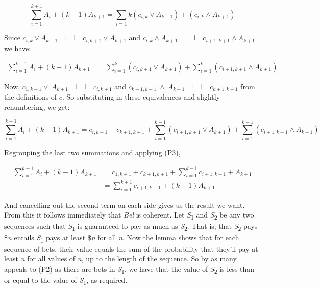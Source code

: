 \documentclass[
  10pt,
  letterpaper,
  DIV=11,
  numbers=noendperiod,
  twoside]{scrartcl}
\begin{document}
\[
\sum_{i=1}^{k+1}A_i + (k-1)A_{k+1} = \sum_{i=1}{k}(c_{i,k} \vee A_{k+1}) + (c_{i,k} \wedge A_{k+1})
\]

Since \(c_{i,k} \vee A_{k+1}\) \(\dashv\)~\(\vdash\)
\(c_{i,k+1} \vee A_{k+1}\) and \(c_{i,k} \wedge A_{k+1}\)
\(\dashv\)~\(\vdash\) \(c_{i+1,k+1} \wedge A_{k+1}\) we have:

\[
\begin{aligned}
\sum_{i=1}^{k+1}A_i + (k-1)A_{k+1} &= \sum_{i=1}^{k}(c_{i,k+1} \vee A_{k+1}) + \sum_{i=1}^{k}(c_{i+1,k+1} \wedge A_{k+1})
\end{aligned}
\]

Now, \(c_{1,k+1} \vee~ A_{k+1}\) \(\dashv\)~\(\vdash\) \(c_{i,k+1}\) and
\(c_{k+1,k+1} ~\wedge~ A_{k+1}\) \(\dashv\)~\(\vdash\) \(c_{k+1,k+1}\)
from the definitions of \(c\). So substituting in these equivalences and
slightly renumbering, we get:

\[
\sum_{i=1}^{k+1}A_i + (k-1)A_{k+1} = c_{i,k+1} +c_{k+1,k+1} + \sum_{i=1}^{k-1}(c_{i+1,k+1} \vee A_{k+1}) + \sum_{i=1}^{k-1}(c_{i+1,k+1} \wedge A_{k+1})
\]

Regrouping the last two summations and applying (P3),

\begin{figure*}

\[
\begin{aligned}
\sum_{i=1}^{k+1}A_i + (k-1)A_{k+1} &= c_{1,k+1} + c_{k+1,k+1} + \sum_{i=1}^{k-1}c_{i+1,k+1} + A_{k+1} \\
&= \sum_{i=1}^{k+1}c_{i+1,k+1} + (k-1)A_{k+1}
\end{aligned}
\]

\end{figure*}%

And cancelling out the second term on each side gives us the result we
want. From this it follows immediately that \emph{Bel} is coherent. Let
\emph{S}\textsubscript{1} and \emph{S}\textsubscript{2} be any two
sequences such that \emph{S}\textsubscript{1} is guaranteed to pay as
much as \emph{S}\textsubscript{2}. That is, that
\emph{S}\textsubscript{2} pays \$\emph{n} entails
\emph{S}\textsubscript{1} pays at least \$\emph{n} for all \emph{n}. Now
the lemma shows that for each sequence of bets, their value equals the
sum of the probability that they'll pay at least \emph{n} for all values
of \emph{n}, up to the length of the sequence. So by as many appeals to
(P2) as there are bets in \emph{S}\textsubscript{1}, we have that the
value of \emph{S}\textsubscript{2} is less than or equal to the value of
\emph{S}\textsubscript{1}, as required.
\end{document}
